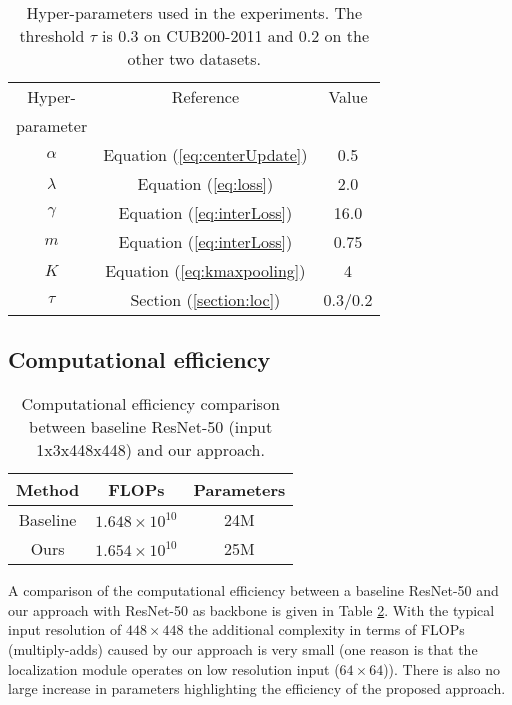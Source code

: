 \documentclass[10pt,twocolumn,letterpaper]{article}
\begin{document}
\begin{table}
  \begin{center}
  \begin{tabular} {|c|c|c|}
    \hline
    Hyper-    & Reference & Value \\
    parameter &           & \\
    \hline
    \hline
    $\alpha$    & Equation (\ref{eq:centerUpdate}) & 0.5 \\
    $\lambda$   & Equation (\ref{eq:loss}) & 2.0\\
    $\gamma$   & Equation (\ref{eq:interLoss}) & 16.0 \\
    $m$        & Equation (\ref{eq:interLoss}) & 0.75 \\
    $K$        & Equation (\ref{eq:kmaxpooling}) &  4\\
    $\tau$     & Section (\ref{section:loc})& 0.3/0.2\\
    \hline
  \end{tabular}
  \end{center}
  \caption{Hyper-parameters used in the experiments. The threshold $\tau$ is 0.3 on CUB200-2011 and 0.2 on the other two datasets.}
  \label{table:params}
\end{table}

\subsection{Computational efficiency}
\begin{table}
  \begin{center}
  \begin{tabular} {|c|c|c|}
    \hline
    Method & FLOPs & Parameters  \\
    \hline
    \hline
    Baseline  & $1.648 \times 10^{10}$ & 24M \\
    Ours      &  $1.654 \times 10^{10}$ & 25M \\
    \hline
  \end{tabular}
  \end{center}
  \caption{Computational efficiency comparison between baseline ResNet-50 (input 1x3x448x448) and our approach.}
  \label{table:complex}
\end{table}
A comparison of the computational efficiency between a baseline ResNet-50 and our approach with ResNet-50 as backbone is given in Table \ref{table:complex}. With the typical input resolution of $448 \times 448$ the additional complexity in terms of FLOPs (multiply-adds) caused by our approach is very small (one reason is that the localization module operates on low resolution input ($64 \times 64$)). There is also no large increase in parameters highlighting the efficiency of the proposed approach.
\end{document}
